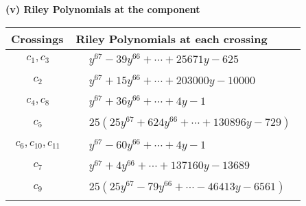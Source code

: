 \documentclass[1p]{elsarticle_modified}
\theoremstyle{definition}
\begin{document}
\flushleft \textbf{(v) Riley Polynomials at the component}\newline \\
\begin{tabular}{m{50pt}|m{274pt}}
Crossings & \hspace{64pt}Riley Polynomials at each crossing \\
\hline $$\begin{aligned}c_{1},c_{3}\end{aligned}$$&$\begin{aligned}
&y^{67}-39 y^{66}+\cdots+25671 y-625
\end{aligned}$\\
\hline $$\begin{aligned}c_{2}\end{aligned}$$&$\begin{aligned}
&y^{67}+15 y^{66}+\cdots+203000 y-10000
\end{aligned}$\\
\hline $$\begin{aligned}c_{4},c_{8}\end{aligned}$$&$\begin{aligned}
&y^{67}+36 y^{66}+\cdots+4 y-1
\end{aligned}$\\
\hline $$\begin{aligned}c_{5}\end{aligned}$$&$\begin{aligned}
&25(25 y^{67}+624 y^{66}+\cdots+130896 y-729)
\end{aligned}$\\
\hline $$\begin{aligned}c_{6},c_{10},c_{11}\end{aligned}$$&$\begin{aligned}
&y^{67}-60 y^{66}+\cdots+4 y-1
\end{aligned}$\\
\hline $$\begin{aligned}c_{7}\end{aligned}$$&$\begin{aligned}
&y^{67}+4 y^{66}+\cdots+137160 y-13689
\end{aligned}$\\
\hline $$\begin{aligned}c_{9}\end{aligned}$$&$\begin{aligned}
&25(25 y^{67}-79 y^{66}+\cdots-46413 y-6561)
\end{aligned}$\\
\hline
\end{tabular}\\~\\
\end{document}
